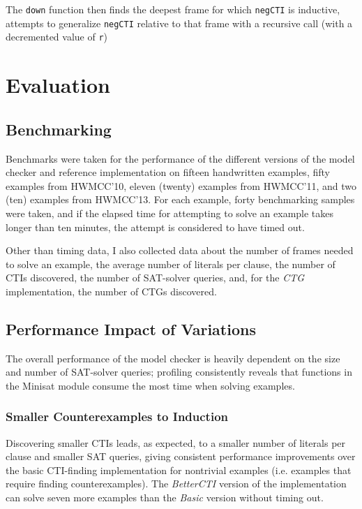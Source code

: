 \documentclass[12pt,a4paper,twoside,openright]{report}
\begin{document}
The \verb,down, function then finds the deepest frame for which \verb,negCTI, is inductive, attempts to generalize
\verb,negCTI, relative to that frame with a recursive call (with a decremented value of \verb,r,)

\chapter{Evaluation}

\section{Benchmarking}
Benchmarks were taken for the performance of the different versions of the model checker and reference implementation
on fifteen handwritten examples, fifty examples from HWMCC'10, eleven (twenty) examples from HWMCC'11, and two (ten)
examples from HWMCC'13. For each example, forty benchmarking samples were taken, and if the elapsed time for
attempting to solve an example takes longer than ten minutes, the attempt is considered to have timed out.

Other than timing data, I also collected data about the number of frames needed to solve an example,
the average number of literals per clause, the number of CTIs discovered, the number of SAT-solver queries, and,
for the \emph{CTG} implementation, the number of CTGs discovered.

\section{Performance Impact of Variations}

The overall performance of the model checker is heavily dependent on the size and number of SAT-solver queries;
profiling consistently reveals that functions in the Minisat module consume the most time when solving examples.

\subsection{Smaller Counterexamples to Induction}

Discovering smaller CTIs leads, as expected, to a smaller number of literals per clause and smaller SAT queries,
giving consistent performance improvements over the basic CTI-finding implementation for nontrivial
examples (i.e. examples that require finding counterexamples). The \emph{BetterCTI} version of the implementation
can solve seven more examples than the \emph{Basic} version without timing out.
\end{document}
